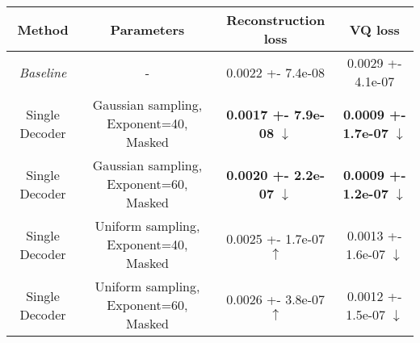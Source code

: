 \centering
\scriptsize
\begin{tabular}{||c|c|c|c||}
\hline
 Method & Parameters & Reconstruction loss & VQ loss \\
\hline
\textit{Baseline} & - & 0.0022 +- 7.4e-08 & 0.0029 +- 4.1e-07 \\
\hline
Single Decoder & Gaussian sampling, Exponent=40, Masked & \textbf{0.0017 +- 7.9e-08}  $\downarrow$ & \textbf{0.0009 +- 1.7e-07}  $\downarrow$ \\
\hline
Single Decoder & Gaussian sampling, Exponent=60, Masked & \textbf{0.0020 +- 2.2e-07}  $\downarrow$ & \textbf{0.0009 +- 1.2e-07}  $\downarrow$ \\
\hline
Single Decoder & Uniform sampling, Exponent=40, Masked & 0.0025 +- 1.7e-07  $\uparrow$ & 0.0013 +- 1.6e-07  $\downarrow$ \\
\hline
Single Decoder & Uniform sampling, Exponent=60, Masked & 0.0026 +- 3.8e-07  $\uparrow$ & 0.0012 +- 1.5e-07  $\downarrow$ \\
\hline
\end{tabular}
